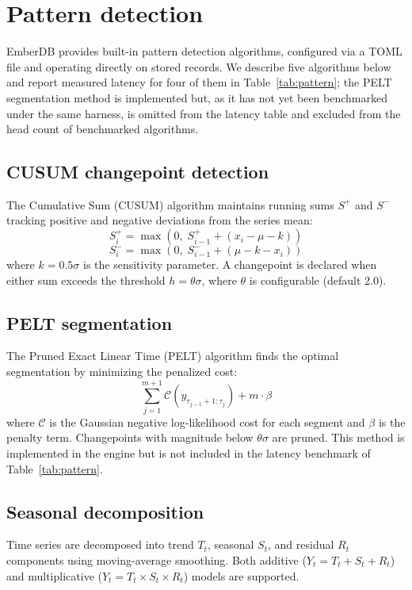 \documentclass[journal]{IEEEtran}
\begin{document}
\section{Pattern detection}
\label{sec:patterns}

EmberDB provides built-in pattern detection algorithms, configured via a TOML file and operating directly on stored records. We describe five algorithms below and report measured latency for four of them in Table~\ref{tab:pattern}; the PELT segmentation method is implemented but, as it has not yet been benchmarked under the same harness, is omitted from the latency table and excluded from the head count of benchmarked algorithms.

\subsection{CUSUM changepoint detection}
The Cumulative Sum (CUSUM) algorithm maintains running sums $S^+$ and $S^-$ tracking positive and negative deviations from the series mean:
\[
S^+_i = \max(0,\; S^+_{i-1} + (x_i - \mu - k))
\]
\[
S^-_i = \max(0,\; S^-_{i-1} + (\mu - k - x_i))
\]
where $k = 0.5\sigma$ is the sensitivity parameter. A changepoint is declared when either sum exceeds the threshold $h = \theta\sigma$, where $\theta$ is configurable (default 2.0).

\subsection{PELT segmentation}
The Pruned Exact Linear Time (PELT) algorithm finds the optimal segmentation by minimizing the penalized cost:
\[
\sum_{j=1}^{m+1} \mathcal{C}(y_{\tau_{j-1}+1:\tau_j}) + m \cdot \beta
\]
where $\mathcal{C}$ is the Gaussian negative log-likelihood cost for each segment and $\beta$ is the penalty term.
Changepoints with magnitude below $\theta\sigma$ are pruned.
This method is implemented in the engine but is not included in the latency benchmark of Table~\ref{tab:pattern}.

\subsection{Seasonal decomposition}
Time series are decomposed into trend $T_t$, seasonal $S_t$, and residual $R_t$ components using moving-average smoothing.
Both additive ($Y_t = T_t + S_t + R_t$) and multiplicative ($Y_t = T_t \times S_t \times R_t$) models are supported.
\end{document}
